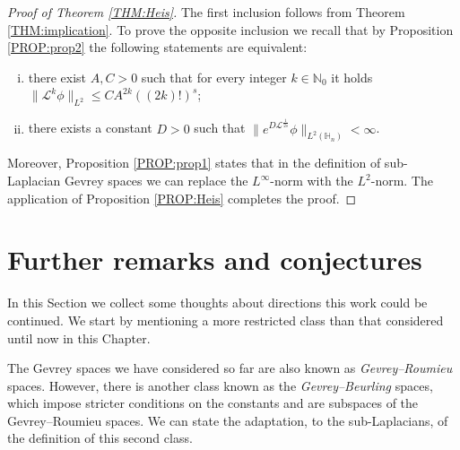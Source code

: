 \documentclass[12pt,oneside,a4paper]{book}
\numberwithin{equation}{section}     %
\theoremstyle{plain}
\theoremstyle{definition}
\newcommand{\N}{{\mathbb N}}
\newcommand{\slp}{{\mathcal L}}
\begin{document}
\begin{proof}[Proof of Theorem \ref{THM:Heis}]
	The first inclusion follows from Theorem \ref{THM:implication}.
	To prove the opposite inclusion we recall that by Proposition \ref{PROP:prop2} the following statements are equivalent:
	\begin{enumerate}[i.]
		\item there exist $A,C>0$ such that for every integer $k\in\N_0$ it holds $\|\slp^k \phi\|_{L^2}\leq C A^{2k}((2k)!)^s$;
		\item there exists a constant $D>0$ such that $\|e^{D\slp^{\frac{1}{2s}}}\phi\|_{L^2(\mathbb H_n)}<\infty$.
	\end{enumerate}
	Moreover, Proposition \ref{PROP:prop1} states that in the definition of sub-Laplacian Gevrey spaces we can replace the $L^\infty$-norm with the $L^2$-norm. The application of Proposition \ref{PROP:Heis} completes the proof.
\end{proof}

\section{Further remarks and conjectures}

In this Section we collect some thoughts about directions this work could be continued. We start by mentioning a more restricted class than that considered until now in this Chapter.

The Gevrey spaces we have considered so far are also known as {\em Gevrey--Roumieu} spaces. However, there is another class known as the {\em Gevrey--Beurling} spaces, which impose stricter conditions on the constants and are subspaces of the Gevrey--Roumieu spaces. We can state the adaptation,  to the sub-Laplacians, of the definition of this second class.
\end{document}
